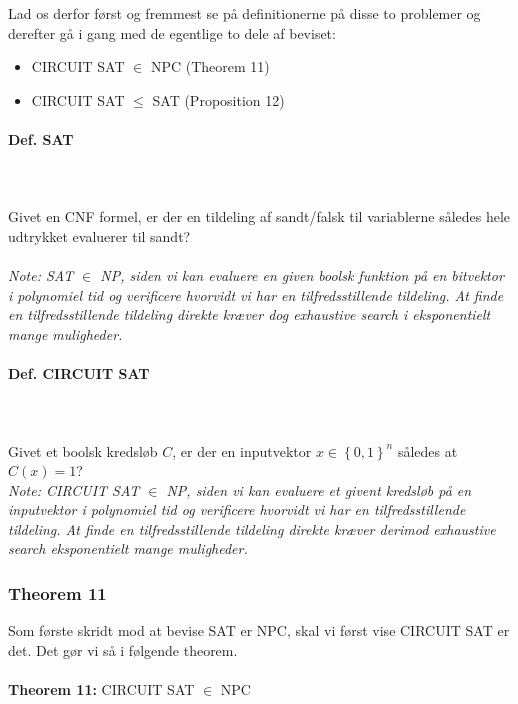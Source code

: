 Lad os derfor først og fremmest se på definitionerne på disse to problemer og derefter gå i gang med de egentlige to dele af beviset:

\begin{itemize}
 \item CIRCUIT SAT $\in$ NPC (Theorem 11)
 \item CIRCUIT SAT $\leq$ SAT (Proposition 12)
\end{itemize}

\paragraph{Def. SAT}
~\\
~\\
Givet en CNF formel, er der en tildeling af sandt/falsk til variablerne således hele udtrykket evaluerer til sandt?\\
~\\
\textit{Note: SAT $\in$ NP, siden vi kan evaluere en given boolsk funktion på en bitvektor i polynomiel tid og verificere hvorvidt vi har en tilfredsstillende tildeling. At finde en tilfredsstillende tildeling direkte kræver dog exhaustive search i eksponentielt mange muligheder.}

\paragraph{Def. CIRCUIT SAT}
~\\
~\\
Givet et boolsk kredsløb $C$, er der en inputvektor $x \in \left\lbrace 0,1 \right\rbrace^n$ således at $C(x) = 1$?
~\\
\textit{Note: CIRCUIT SAT $\in$ NP, siden vi kan evaluere et givent kredsløb på en inputvektor i polynomiel tid og verificere hvorvidt vi har en tilfredsstillende tildeling. At finde en tilfredsstillende tildeling direkte kræver derimod exhaustive search eksponentielt mange muligheder.}

\subsubsection{Theorem 11}

Som første skridt mod at bevise SAT er NPC, skal vi først vise CIRCUIT SAT er det. Det gør vi så i følgende theorem.\\
~\\
\textbf{Theorem 11:} CIRCUIT SAT $\in$ NPC

